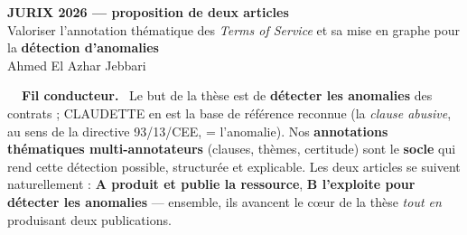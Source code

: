 \documentclass[fontsize=9pt,a4paper]{scrartcl}
\begin{document}
\begin{tcolorbox}[enhanced,colback=navy,colframe=navy,boxrule=0pt,arc=3pt,
  left=12pt,right=12pt,top=8pt,bottom=8pt,
  borderline west={3pt}{0pt}{gold}]
  {\sffamily\bfseries\LARGE\color{white} JURIX 2026 — proposition de deux articles}\\[3pt]
  {\color{white!85}\small Valoriser l'annotation thématique des \emph{Terms of Service} et sa mise en
  graphe pour la \textbf{détection d'anomalies}}\\[5pt]
  {\sffamily\footnotesize\color{gold}Ahmed El Azhar Jebbari}
\end{tcolorbox}

\vspace{3pt}
\begin{tcolorbox}[enhanced,colback=surface,colframe=line,boxrule=0.5pt,arc=2pt,
  left=8pt,right=8pt,top=5pt,bottom=5pt]
  {\sffamily\bfseries\color{navy}\footnotesize\faRoute~~Fil conducteur.}~
  {\small Le but de la thèse est de \textbf{détecter les anomalies} des contrats ; CLAUDETTE en est la
  base de référence reconnue (la \emph{clause abusive}, au sens de la directive 93/13/CEE, = l'anomalie).
  Nos \textbf{annotations thématiques multi-annotateurs} (clauses, thèmes, certitude) sont le
  \textbf{socle} qui rend cette détection possible, structurée et explicable. Les deux articles se suivent
  naturellement : \textbf{A produit et publie la ressource}, \textbf{B l'exploite pour détecter les
  anomalies} — ensemble, ils avancent le cœur de la thèse \emph{tout en} produisant deux publications.}
\end{tcolorbox}
\end{document}

